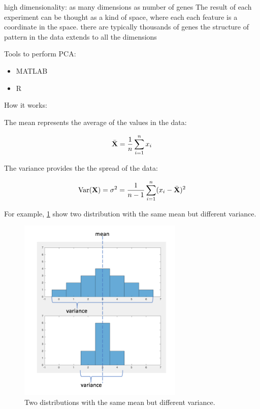 \documentclass[11pt, oneside]{article}   	%
\begin{document}
high dimensionality: 
as many dimensions as number of genes
The result of each experiment can be thought as a kind of space, where each each feature is a coordinate in the space. 
there are typically thousands of genes 
the structure of pattern in the data extends to all the dimensions 

Tools to perform PCA:

\begin{itemize}
   \item MATLAB
   \item R
\end{itemize}


How it works:


The mean represents the average of the values in the data:

\begin{equation}
   \bar{{\bf X}} = \frac{1}{n} \sum_{i=1}^{n} x_i 
\end{equation}

The variance provides the the spread of the data:

\begin{equation}
   \text{Var} ({\bf X}) = \sigma^2  = \frac{1}{n-1} \sum_{i=1}^{n} ( x_i -  \bar{{\bf X}})^2
\end{equation}


For example, \ref{fig:MeanVariance} show two distribution with the same mean but different variance. 

\begin{figure}[!h]
	\centering
	\includegraphics[width=0.7\textwidth]{same-mean_different-variance}
	\caption{Two distributions with the same mean but different variance.}
	\label{fig:MeanVariance}
\end{figure}
\end{document}
